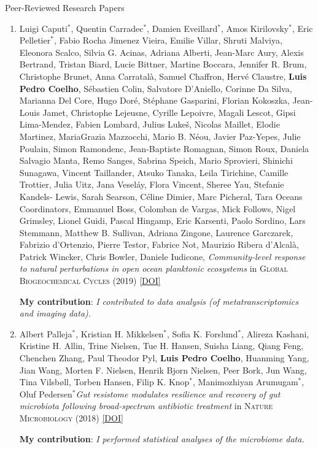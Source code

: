 \documentclass{article}
\renewcommand\subsection[1]{%
    \par\vspace{.1em}%
    {\hspace{1em}\subsubhead #1}%
    \par\vspace{.2em}%
}
\newcommand\showdoi[1]{%
    \href{http://dx.doi.org/#1}{[DOI]}%
}
\newcommand\pubname[1]{\textsc{#1}}
\newcommand\contribution[1]{\relax\hfill\break\textbf{My contribution}: \textit{#1}}
\newcommand\costar{${}^{*}$}
\begin{document}
\medskip
\medskip

\subsection{Peer-Reviewed Research Papers}
\Text

\begin{enumerate}[resume]

\item Luigi Caputi\costar, Quentin Carradec\costar, Damien Eveillard\costar,
Amos Kirilovsky\costar, Eric Pelletier\costar, Fabio Rocha Jimenez Vieira,
Emilie Villar, Shruti Malviya, Eleonora Scalco, Silvia G. Acinas, Adriana
Alberti, Jean-Marc Aury, Alexis Bertrand, Tristan Biard, Lucie Bittner, Martine
Boccara, Jennifer R. Brum, Christophe Brunet, Anna Carratalà, Samuel Chaffron,
Hervé Claustre, \textbf{Luis Pedro Coelho}, Sébastien Colin, Salvatore
D'Aniello, Corinne Da Silva, Marianna Del Core, Hugo Doré, Stéphane Gasparini,
Florian Kokoszka, Jean-Louis Jamet, Christophe Lejeusne, Cyrille Lepoivre,
Magali Lescot, Gipsi Lima-Mendez, Fabien Lombard, Julius Lukeš, Nicolas
Maillet, Elodie Martinez, MariaGrazia Mazzocchi, Mario B.  Néou, Javier
Paz-Yepes, Julie Poulain, Simon Ramondenc, Jean-Baptiste Romagnan, Simon Roux,
Daniela Salvagio Manta, Remo Sanges, Sabrina Speich, Mario Sprovieri, Shinichi
Sunagawa, Vincent Taillander, Atsuko Tanaka, Leila Tirichine, Camille Trottier,
Julia Uitz, Jana Veseláy, Flora Vincent, Sheree Yau, Stefanie Kandels- Lewis,
Sarah Searson, Céline Dimier, Marc Picheral, Tara Oceans Coordinators, Emmanuel
Boss, Colomban de Vargas, Mick Follows, Nigel Grimsley, Lionel Guidi, Pascal
Hingamp, Eric Karsenti, Paolo Sordino, Lars Stemmann, Matthew B.  Sullivan,
Adriana Zingone, Laurence Garczarek, Fabrizio d'Ortenzio, Pierre Testor,
Fabrice Not, Maurizio Ribera d'Alcalà, Patrick Wincker, Chris Bowler, Daniele
Iudicone, \emph{Community-level response to natural perturbations in open ocean
planktonic ecosystems} in \pubname{Global Biogeochemical Cycles} (2019)
\showdoi{10.1029/2018GB006022}
\contribution{I contributed to data analysis (of metatranscriptomics and
imaging data).}

\item Albert Palleja\costar, Kristian H. Mikkelsen\costar, Sofia K.
Forslund\costar, Alireza Kashani, Kristine H. Allin, Trine Nielsen, Tue H.
Hansen, Suisha Liang, Qiang Feng, Chenchen Zhang, Paul Theodor Pyl,
\textbf{Luis Pedro Coelho}, Huanming Yang, Jian Wang, Morten F. Nielsen, Henrik
Bjorn Nielsen, Peer Bork, Jun Wang, Tina Vilsbøll, Torben Hansen, Filip K.
Knop\costar, Manimozhiyan Arumugam\costar, Oluf Pedersen\costar \emph{Gut
resistome modulates resilience and recovery of gut microbiota following
broad-spectrum antibiotic treatment} in \pubname{Nature Microbiology} (2018)
\showdoi{10.1038/s41564-018-0257-9}
\contribution{I performed statistical analyses of the microbiome data.}


\end{enumerate}
\end{document}
